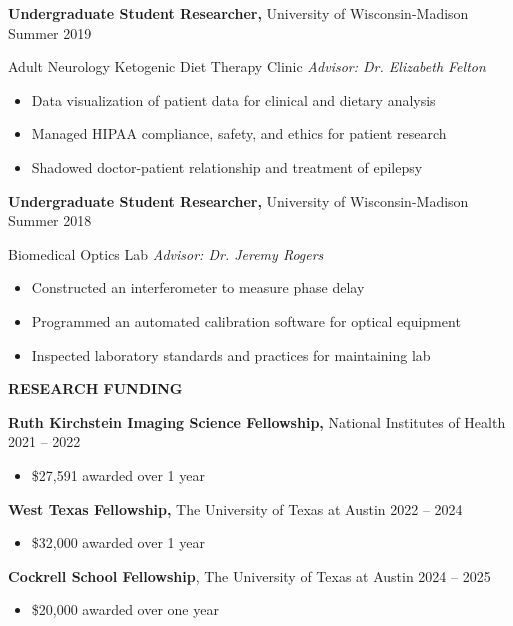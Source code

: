 \documentclass[11pt]{article}
\newcommand{\sectionheading}[1]{%
  \vspace{1.6ex}%
  {\large\bfseries\MakeUppercase{#1}}\par\vspace{0.6ex}%
}
\begin{document}
\textbf{Undergraduate Student Researcher,} University of Wisconsin-Madison Summer 2019

Adult Neurology Ketogenic Diet Therapy Clinic \textbar{} \emph{Advisor: Dr. Elizabeth Felton}

\begin{itemize}
\item
  Data visualization of patient data for clinical and dietary analysis
\item
  Managed HIPAA compliance, safety, and ethics for patient research
\item
  Shadowed doctor-patient relationship and treatment of epilepsy
\end{itemize}

\textbf{Undergraduate Student Researcher,} University of Wisconsin-Madison Summer 2018

Biomedical Optics Lab \textbar{} \emph{Advisor: Dr. Jeremy Rogers}

\begin{itemize}
\item
  Constructed an interferometer to measure phase delay
\item
  Programmed an automated calibration software for optical equipment
\item
  Inspected laboratory standards and practices for maintaining lab
\end{itemize}

\sectionheading{RESEARCH FUNDING}

\textbf{Ruth Kirchstein Imaging Science Fellowship,} National Institutes of Health 2021 -- 2022

\begin{itemize}
\item
  \$27,591 awarded over 1 year
\end{itemize}

\textbf{West Texas Fellowship,} The University of Texas at Austin 2022 -- 2024

\begin{itemize}
\item
  \$32,000 awarded over 1 year
\end{itemize}

\textbf{Cockrell School Fellowship}, The University of Texas at Austin 2024 -- 2025

\begin{itemize}
\item
  \$20,000 awarded over one year
\end{itemize}
\end{document}
